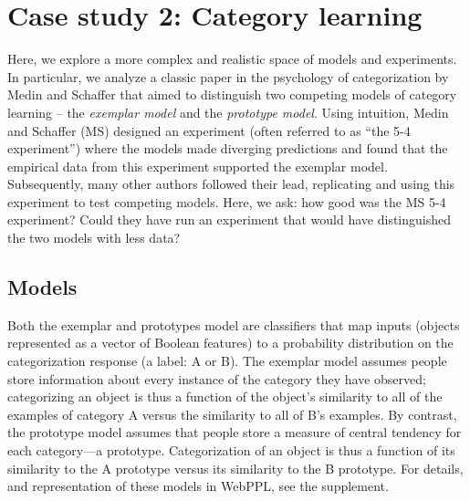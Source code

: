\documentclass{article}
\begin{document}
\section{Case study 2: Category learning}

Here, we explore a more complex and realistic space of models and experiments.
In particular, we analyze a classic paper in the psychology of categorization by Medin and Schaffer \cite{medin78:pr} that aimed to distinguish two competing models of category learning -- the \emph{exemplar model} and the \emph{prototype model}.
Using intuition, Medin and Schaffer (MS) designed an experiment (often referred to as ``the 5-4 experiment'') where the models made diverging predictions and found that the empirical data from this experiment supported the exemplar model.
Subsequently, many other authors followed their lead, replicating and using this experiment to test competing models.
Here, we ask: how good was the MS 5-4 experiment?
Could they have run an experiment that would have distinguished the two models with less data?




\subsection{Models}

Both the exemplar and prototypes model are classifiers that map inputs (objects represented as a vector of Boolean features) to a probability distribution on the categorization response (a label: A or B).
The exemplar model assumes people store information about every instance of the category they have observed; categorizing an object is thus a function of the object's similarity to all of the examples of category A versus the similarity to all of B's examples.
By contrast, the prototype model assumes that people store a measure of central tendency for each category---a prototype.
Categorization of an object is thus a function of its similarity to the A prototype versus its similarity to the B prototype.
For details, and representation of these models in WebPPL, see the supplement.
\end{document}
